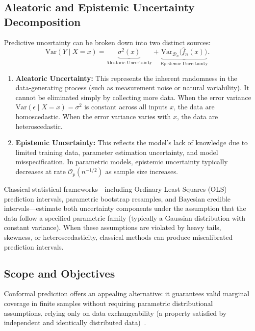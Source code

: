 \documentclass[journal]{IEEEtran}
\begin{document}
\subsection{Aleatoric and Epistemic Uncertainty Decomposition}
Predictive uncertainty can be broken down into two distinct sources:
\begin{equation}
\text{Var}(Y \mid X = x) = \underbrace{\sigma^2(x)}_{\text{Aleatoric Uncertainty}} + \underbrace{\text{Var}_{\mathcal{D}_n}\big(\hat{f}_n(x)\big)}_{\text{Epistemic Uncertainty}}.
\end{equation}
\begin{enumerate}
    \item \textbf{Aleatoric Uncertainty:} This represents the inherent randomness in the data-generating process (such as measurement noise or natural variability). It cannot be eliminated simply by collecting more data. When the error variance $\text{Var}(\epsilon \mid X = x) = \sigma^2$ is constant across all inputs $x$, the data are homoscedastic. When the error variance varies with $x$, the data are heteroscedastic.
    \item \textbf{Epistemic Uncertainty:} This reflects the model's lack of knowledge due to limited training data, parameter estimation uncertainty, and model misspecification. In parametric models, epistemic uncertainty typically decreases at rate $\mathcal{O}_p(n^{-1/2})$ as sample size increases.
\end{enumerate}

Classical statistical frameworks---including Ordinary Least Squares (OLS) prediction intervals, parametric bootstrap resamples, and Bayesian credible intervals---estimate both uncertainty components under the assumption that the data follow a specified parametric family (typically a Gaussian distribution with constant variance). When these assumptions are violated by heavy tails, skewness, or heteroscedasticity, classical methods can produce miscalibrated prediction intervals.

\subsection{Scope and Objectives}
Conformal prediction offers an appealing alternative: it guarantees valid marginal coverage in finite samples without requiring parametric distributional assumptions, relying only on data exchangeability (a property satisfied by independent and identically distributed data)~\cite{angelopoulos2023, vovk2005}. 
\end{document}
